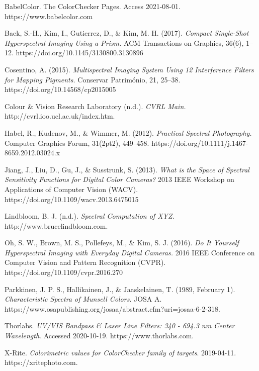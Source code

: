 \documentclass[twocolumn,10pt]{asme2ej}
\begin{document}
 \begin{thebibliography}{12}

{BabelColor. {The ColorChecker Pages}. Access 2021-08-01. https://www.babelcolor.com}

{Baek, S.-H., Kim, I., Gutierrez, D., \& Kim, M. H. (2017). \emph{Compact Single-Shot Hyperspectral Imaging Using a Prism.} ACM Transactions on Graphics, 36(6), 1–12. https://doi.org/10.1145/3130800.3130896}

{Cosentino, A. (2015). \emph{Multispectral Imaging System Using 12 Interference Filters for Mapping Pigments.} Conservar Património, 21, 25–38. https://doi.org/10.14568/cp2015005}

{Colour \& Vision Research Laboratory (n.d.). \emph{CVRL Main.} http://cvrl.ioo.ucl.ac.uk/index.htm.}

{Habel, R., Kudenov, M., \& Wimmer, M. (2012). \emph{Practical Spectral Photography.} Computer Graphics Forum, 31(2pt2), 449–458. https://doi.org/10.1111/j.1467-8659.2012.03024.x}

{Jiang, J., Liu, D., Gu, J., \& Susstrunk, S. (2013). \emph{What is the Space of Spectral Sensitivity Functions for Digital Color Cameras?} 2013 IEEE Workshop on Applications of Computer Vision (WACV). https://doi.org/10.1109/wacv.2013.6475015}

{Lindbloom, B. J. (n.d.). \emph{Spectral Computation of XYZ.} http://www.brucelindbloom.com.}

{Oh, S. W., Brown, M. S., Pollefeys, M., \& Kim, S. J. (2016). \emph{Do It Yourself Hyperspectral Imaging with Everyday Digital Cameras.} 2016 IEEE Conference on Computer Vision and Pattern Recognition (CVPR). https://doi.org/10.1109/cvpr.2016.270}

 {Parkkinen, J. P. S., Hallikainen, J., \& Jaaskelainen, T. (1989, February 1). \emph{Characteristic Spectra of Munsell Colors}. JOSA A. https://www.osapublishing.org/josaa/abstract.cfm?uri=josaa-6-2-318.}

{Thorlabs. \emph{UV/VIS Bandpass \& Laser Line Filters: 340 - 694.3 nm Center Wavelength}. Accessed 2020-10-19. https://www.thorlabs.com.}

{X-Rite. \emph{Colorimetric values for ColorChecker family of targets}. 2019-04-11. https://xritephoto.com.}

\end{thebibliography}
 
\end{document}
